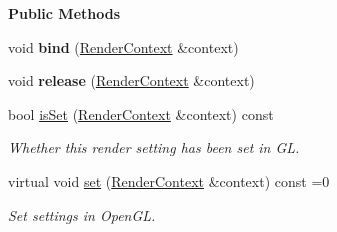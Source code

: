 \begin{Indent}\textbf{ Public Methods}\par
\begin{DoxyCompactItemize}
\item 
\mbox{\label{classrev_1_1_render_setting_afa5175ab44131d2b4e3775eaf00b1331}} 
void {\bfseries bind} (\mbox{\hyperlink{classrev_1_1_render_context}{Render\+Context}} \&context)
\item 
\mbox{\label{classrev_1_1_render_setting_a6f5e62beca0fbcea32ebb8a40b94fe6f}} 
void {\bfseries release} (\mbox{\hyperlink{classrev_1_1_render_context}{Render\+Context}} \&context)
\item 
\mbox{\label{classrev_1_1_render_setting_aaba8ba2f667a902dd8c501e80e96827c}} 
bool \mbox{\hyperlink{classrev_1_1_render_setting_aaba8ba2f667a902dd8c501e80e96827c}{is\+Set}} (\mbox{\hyperlink{classrev_1_1_render_context}{Render\+Context}} \&context) const
\begin{DoxyCompactList}\small\item\em Whether this render setting has been set in GL. \end{DoxyCompactList}\item 
\mbox{\label{classrev_1_1_render_setting_a59d0d5debdfa3bb7bb591b8202d8da0c}} 
virtual void \mbox{\hyperlink{classrev_1_1_render_setting_a59d0d5debdfa3bb7bb591b8202d8da0c}{set}} (\mbox{\hyperlink{classrev_1_1_render_context}{Render\+Context}} \&context) const =0
\begin{DoxyCompactList}\small\item\em Set settings in Open\+GL. \end{DoxyCompactList}\end{DoxyCompactItemize}
\end{Indent}
